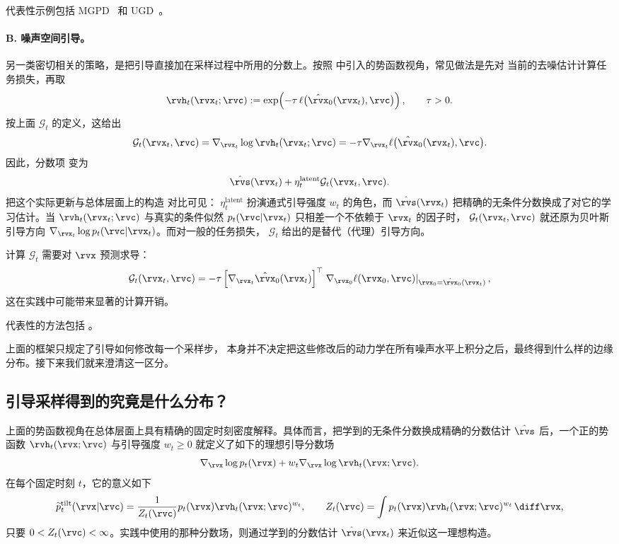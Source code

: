 代表性示例包括 MGPD~\citep{he2023manifold} 和
UGD~\citep{bansal2023universal}。


\paragraph{B. 噪声空间引导。}
另一类密切相关的策略，是把引导直接加在采样过程中所用的分数上。按照
 中引入的势函数视角，常见做法是先对
当前的去噪估计计算任务损失，再取
\[
\rvh_t(\rvx_t;\rvc)
:=
\exp\!\left(
-\tau\,\ell\bigl(\hat{\rvx}_0(\rvx_t),\rvc\bigr)
\right),
\qquad \tau>0.
\]
按上面 $\mathcal G_t$ 的定义，这给出
\begin{align*}
\mathcal G_t(\rvx_t,\rvc)
=
\nabla_{\rvx_t}\log\rvh_t(\rvx_t;\rvc)
=
-\tau
\nabla_{\rvx_t}
\ell\bigl(\hat{\rvx}_0(\rvx_t),\rvc\bigr).
\end{align*}
因此，分数项
 变为
\[
\hat{\rvs}(\rvx_t)
+
\eta_t^{\text{latent}}
\mathcal G_t(\rvx_t,\rvc).
\]
把这个实际更新与总体层面上的构造
 对比可见：
$\eta_t^{\text{latent}}$ 扮演通式引导强度
$w_t$ 的角色，而 $\hat{\rvs}(\rvx_t)$ 把精确的无条件分数换成了对它的学习估计。当 $\rvh_t(\rvx_t;\rvc)$ 与真实的条件似然
$p_t(\rvc|\rvx_t)$ 只相差一个不依赖于 $\rvx_t$ 的因子时，
$\mathcal G_t(\rvx_t,\rvc)$ 就还原为贝叶斯引导方向
$\nabla_{\rvx_t}\log p_t(\rvc|\rvx_t)$。而对一般的任务损失，
$\mathcal G_t$ 给出的是替代（代理）引导方向。

计算 $\mathcal G_t$ 需要对
$\rvx$ 预测求导：
\[
\mathcal G_t(\rvx_t,\rvc)
=
-\tau
\left[
\nabla_{\rvx_t}\hat{\rvx}_0(\rvx_t)
\right]^\top
\left.
\nabla_{\rvx_0}\ell(\rvx_0,\rvc)
\right|_{\rvx_0=\hat{\rvx}_0(\rvx_t)},
\]
这在实践中可能带来显著的计算开销。

代表性的方法包括
\citep{yu2023freedom,chung2022diffusion,bansal2023universal}。

上面的框架只规定了引导如何修改每一个采样步，
本身并不决定把这些修改后的动力学在所有噪声水平上积分之后，最终得到什么样的边缘分布。接下来我们就来澄清这一区分。

\subsection{引导采样得到的究竟是什么分布？}
\label{subsec:guided-marginal-path}

上面的势函数视角在总体层面上具有精确的固定时刻密度解释。具体而言，把学到的无条件分数换成精确的分数估计 $\hat{\rvs}$ 后，一个正的势函数 $\rvh_t(\rvx;\rvc)$ 与引导强度 $w_t\geq0$ 就定义了如下的理想引导分数场
\[
\nabla_{\rvx}\log p_t(\rvx)
+
w_t\nabla_{\rvx}\log\rvh_t(\rvx;\rvc).
\]
在每个固定时刻 $t$，它的意义如下
\begin{align}
\widetilde p_t^{\mathrm{tilt}}(\rvx|\rvc)
=
\frac{1}{Z_t(\rvc)}
p_t(\rvx)\rvh_t(\rvx;\rvc)^{w_t},
\qquad
Z_t(\rvc)
=
\int
p_t(\rvx)\rvh_t(\rvx;\rvc)^{w_t}\,\diff\rvx,
\label{eq:guided-fixed-time-tilt}
\end{align}
只要 $0<Z_t(\rvc)<\infty$。实践中使用的那种分数场，则通过学到的分数估计
$\hat{\rvs}(\rvx_t)$ 来近似这一理想构造。

